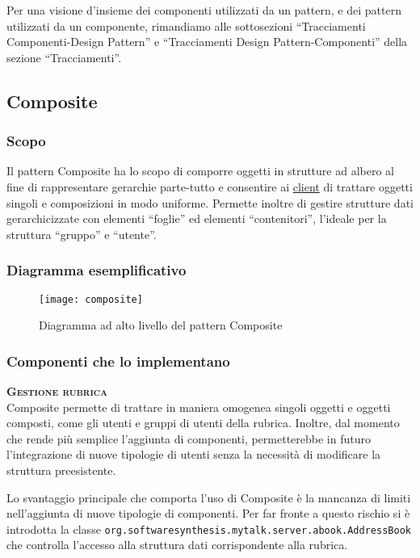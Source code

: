 Per una visione d'insieme dei componenti utilizzati da un pattern, e dei pattern utilizzati da un componente, rimandiamo alle sottosezioni ``Tracciamenti Componenti-Design Pattern'' e ``Tracciamenti Design Pattern-Componenti'' della sezione ``Tracciamenti''.

\subsection{Composite}

\subsubsection{Scopo}
Il pattern Composite ha lo scopo di comporre oggetti in strutture ad albero al fine di rappresentare gerarchie parte-tutto e consentire ai \underline{client} di trattare oggetti singoli e composizioni in modo uniforme. Permette inoltre di gestire strutture dati gerarchicizzate con elementi ``foglie'' ed elementi ``contenitori'', l'ideale per la struttura ``gruppo'' e ``utente''.

\subsubsection{Diagramma esemplificativo}
\begin{figure}[H]
\centering
\texttt{[image: composite]}
\caption{Diagramma ad alto livello del pattern Composite}\label{fig:composite}
\end{figure}

\subsubsection{Componenti che lo implementano}
\begin{description}
\item{\bfseries\scshape Gestione rubrica}\\
Composite permette di trattare in maniera omogenea singoli oggetti e oggetti composti, come gli utenti e gruppi di utenti della rubrica. Inoltre, dal momento che rende più semplice l'aggiunta di componenti, permetterebbe in futuro l'integrazione di nuove tipologie di utenti senza la necessità di modificare la struttura preesistente.

Lo svantaggio principale che comporta l'uso di Composite è la mancanza di limiti nell'aggiunta di nuove tipologie di componenti. Per far fronte a questo rischio si è introdotta la classe \texttt{org.softwaresynthesis.mytalk.server.abook.AddressBook} che controlla l'accesso alla struttura dati corrispondente alla rubrica.
\end{description}

